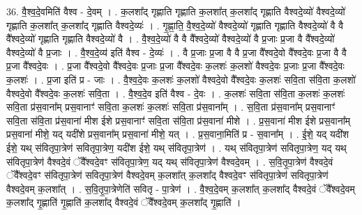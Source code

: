 \documentclass[17pt]{extarticle}
\begin{document}
36. वै॒श्व॒दे॒वमिति॑ वैश्व - दे॒वम् । . क॒लशा᳚द् गृह्णाति गृह्णाति क॒लशा᳚त् क॒लशा᳚द् गृह्णाति वैश्वदे॒व्यो॑ वैश्वदे॒व्यो॑ गृह्णाति क॒लशा᳚त् क॒लशा᳚द् गृह्णाति वैश्वदे॒व्यः॑ । . गृ॒ह्णा॒ति॒ वै॒श्व॒दे॒व्यो॑ वैश्वदे॒व्यो॑ गृह्णाति गृह्णाति वैश्वदे॒व्यो॑ वै वै वै᳚श्वदे॒व्यो॑ गृह्णाति गृह्णाति वैश्वदे॒व्यो॑ वै । . वै॒श्व॒दे॒व्यो॑ वै वै वै᳚श्वदे॒व्यो॑ वैश्वदे॒व्यो॑ वै प्र॒जाः प्र॒जा वै वै᳚श्वदे॒व्यो॑ वैश्वदे॒व्यो॑ वै प्र॒जाः । . वै॒श्व॒दे॒व्य॑ इति॑ वैश्व - दे॒व्यः॑ । . वै प्र॒जाः प्र॒जा वै वै प्र॒जा वै᳚श्वदे॒वो वै᳚श्वदे॒वः प्र॒जा वै वै प्र॒जा वै᳚श्वदे॒वः । . प्र॒जा वै᳚श्वदे॒वो वै᳚श्वदे॒वः प्र॒जाः प्र॒जा वै᳚श्वदे॒वः क॒लशः॑ क॒लशो॑ वैश्वदे॒वः प्र॒जाः प्र॒जा वै᳚श्वदे॒वः क॒लशः॑ । . प्र॒जा इति॑ प्र - जाः । . वै॒श्व॒दे॒वः क॒लशः॑ क॒लशो॑ वैश्वदे॒वो वै᳚श्वदे॒वः क॒लशः॑ सवि॒ता स॑वि॒ता क॒लशो॑ वैश्वदे॒वो वै᳚श्वदे॒वः क॒लशः॑ सवि॒ता । . वै॒श्व॒दे॒व इति॑ वैश्व - दे॒वः । . क॒लशः॑ सवि॒ता स॑वि॒ता क॒लशः॑ क॒लशः॑ सवि॒ता प्र॑स॒वाना᳚म् प्रस॒वानाꣳ॑ सवि॒ता क॒लशः॑ क॒लशः॑ सवि॒ता प्र॑स॒वाना᳚म् । . स॒वि॒ता प्र॑स॒वाना᳚म् प्रस॒वानाꣳ॑ सवि॒ता स॑वि॒ता प्र॑स॒वाना॑ मीश ईशे प्रस॒वानाꣳ॑ सवि॒ता स॑वि॒ता प्र॑स॒वाना॑ मीशे । . प्र॒स॒वाना॑ मीश ईशे प्रस॒वाना᳚म् प्रस॒वाना॑ मीशे॒ यद् यदी॑शे प्रस॒वाना᳚म् प्रस॒वाना॑ मीशे॒ यत् । . प्र॒स॒वाना॒मिति॑ प्र - स॒वाना᳚म् । . ई॒शे॒ यद् यदी॑श ईशे॒ यथ् स॑वितृपा॒त्रेण॑ सवितृपा॒त्रेण॒ यदी॑श ईशे॒ यथ् स॑वितृपा॒त्रेण॑ । . यथ् स॑वितृपा॒त्रेण॑ सवितृपा॒त्रेण॒ यद् यथ् स॑वितृपा॒त्रेण॑ वैश्वदे॒वं ॅवै᳚श्वदे॒वꣳ स॑वितृपा॒त्रेण॒ यद् यथ् स॑वितृपा॒त्रेण॑ वैश्वदे॒वम् । . स॒वि॒तृ॒पा॒त्रेण॑ वैश्वदे॒वं ॅवै᳚श्वदे॒वꣳ स॑वितृपा॒त्रेण॑ सवितृपा॒त्रेण॑ वैश्वदे॒वम् क॒लशा᳚त् क॒लशा᳚द् वैश्वदे॒वꣳ स॑वितृपा॒त्रेण॑ सवितृपा॒त्रेण॑ वैश्वदे॒वम् क॒लशा᳚त् । . स॒वि॒तृ॒पा॒त्रेणेति॑ सवितृ - पा॒त्रेण॑ । . वै॒श्व॒दे॒वम् क॒लशा᳚त् क॒लशा᳚द् वैश्वदे॒वं ॅवै᳚श्वदे॒वम् क॒लशा᳚द् गृ॒ह्णाति॑ गृ॒ह्णाति॑ क॒लशा᳚द् वैश्वदे॒वं ॅवै᳚श्वदे॒वम् क॒लशा᳚द् गृ॒ह्णाति॑ । \newline
\end{document}
